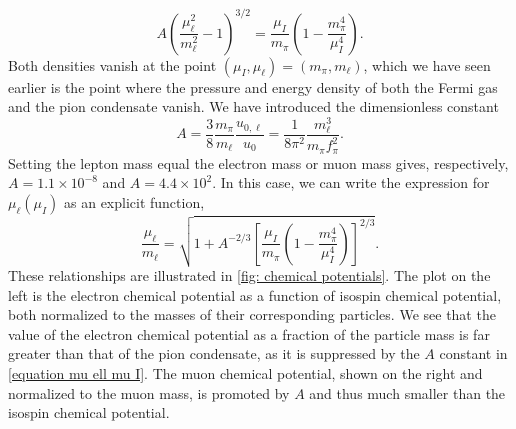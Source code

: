 %
\begin{equation}
    \label{equation mu ell mu I}
    A \left(\frac{\mu_\ell^2 }{m_\ell^2} - 1 \right)^{3/2}
    = \frac{\mu_I}{m_\pi}\left( 1 - \frac{m_\pi^4}{\mu_I^4}  \right).
\end{equation}
%
Both densities vanish at the point $(\mu_I, \mu_\ell) = (m_\pi, m_\ell)$, which we have seen earlier is the point where the pressure and energy density of both the Fermi gas and the pion condensate vanish.
We have introduced the dimensionless constant
%
\begin{equation}
    A = \frac{3}{8} \frac{m_\pi} {m_\ell} \frac{u_{0, \ell}}{u_0}
    = \frac{1}{8 \pi^2} \frac{m_\ell^3}{m_\pi f_\pi^2}.
\end{equation}
%
Setting the lepton mass equal the electron mass or muon mass gives, respectively, $A = 1.1 \times10^{- 8}$ and $A = 4.4 \times 10^{2}$.
In this case, we can write the expression for $\mu_\ell(\mu_I)$ as an explicit function,
%
\begin{equation}
    \label{mu ell from mu I}
    \frac{\mu_\ell}{m_\ell}
    =
    \sqrt{
        1 + A^{-2/3}
        \left[
            \frac{\mu_I}{m_\pi}\left( 1 - \frac{m_\pi^4}{\mu_I^4}  \right)
        \right]^{2/3}
    }.
\end{equation}
%
These relationships are illustrated in \autoref{fig: chemical potentials}.
The plot on the left is the electron chemical potential as a function of isospin chemical potential, both normalized to the masses of their corresponding particles.
We see that the value of the electron chemical potential as a fraction of the particle mass is far greater than that of the pion condensate, as it is suppressed by the $A$ constant in \autoref{equation mu ell mu I}.
The muon chemical potential, shown on the right and normalized to the muon mass, is promoted by $A$ and thus much smaller than the isospin chemical potential.

